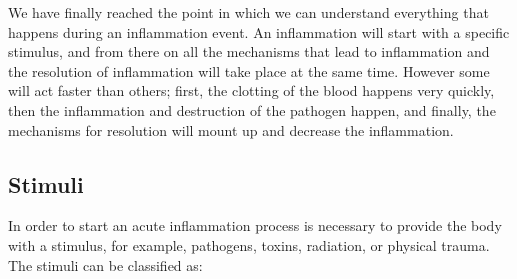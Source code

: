 We have finally reached the point in which we can understand everything that happens during an inflammation event. An inflammation will start with a specific stimulus, and from there on all the mechanisms that lead to inflammation and the resolution of inflammation will take place at the same time. However some will act faster than others; first, the clotting of the blood happens very quickly, then the inflammation and destruction of the pathogen happen, and finally, the mechanisms for resolution will mount up and decrease the inflammation.

\subsection{Stimuli}

In order to start an acute inflammation process is necessary to provide the body with a stimulus, for example, pathogens, toxins, radiation, or physical trauma. The stimuli can be classified as:

